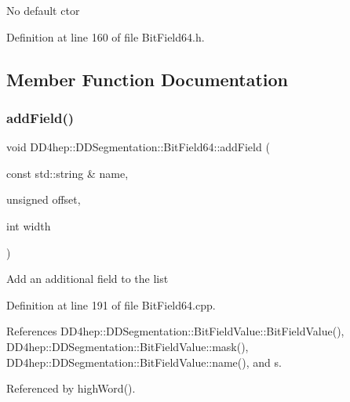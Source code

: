 No default c\textquotesingle{}tor 

Definition at line 160 of file Bit\+Field64.\+h.



\subsection{Member Function Documentation}
\hypertarget{class_d_d4hep_1_1_d_d_segmentation_1_1_bit_field64_ae34df46a8957a5a6df76d194889a7d06}{}\label{class_d_d4hep_1_1_d_d_segmentation_1_1_bit_field64_ae34df46a8957a5a6df76d194889a7d06} 
\subsubsection{\texorpdfstring{add\+Field()}{addField()}}
{\footnotesize\ttfamily void D\+D4hep\+::\+D\+D\+Segmentation\+::\+Bit\+Field64\+::add\+Field (\begin{DoxyParamCaption}\item[{const std\+::string \&}]{name,  }\item[{unsigned}]{offset,  }\item[{int}]{width }\end{DoxyParamCaption})\hspace{0.3cm}{\ttfamily [protected]}}

Add an additional field to the list 

Definition at line 191 of file Bit\+Field64.\+cpp.



References D\+D4hep\+::\+D\+D\+Segmentation\+::\+Bit\+Field\+Value\+::\+Bit\+Field\+Value(), D\+D4hep\+::\+D\+D\+Segmentation\+::\+Bit\+Field\+Value\+::mask(), D\+D4hep\+::\+D\+D\+Segmentation\+::\+Bit\+Field\+Value\+::name(), and s.



Referenced by high\+Word().

\hypertarget{class_d_d4hep_1_1_d_d_segmentation_1_1_bit_field64_a386f0fdf56eb495e5aa58dd0f64225f6}{}\label{class_d_d4hep_1_1_d_d_segmentation_1_1_bit_field64_a386f0fdf56eb495e5aa58dd0f64225f6} 
